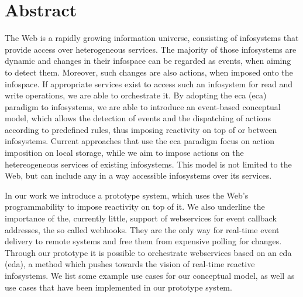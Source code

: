 \chapter*{Abstract}
The Web is a rapidly growing information universe, consisting of \textrm{\glspl{infosystem}} that provide access over heterogeneous services.
The majority of those \textrm{\glspl{infosystem}} are dynamic and changes in their \textrm{\gls{infospace}} can be regarded as events, when aiming to detect them.
Moreover, such changes are also actions, when imposed onto the \textrm{\gls{infospace}}.
If appropriate services exist to access such an \textrm{\gls{infosystem}} for read and write operations, we are able to orchestrate it.
By adopting the \textrm{\acrlong{eca} (\acrshort{eca})} paradigm to \textrm{\glspl{infosystem}}, we are able to introduce an event-based conceptual model, which allows the detection of events and the dispatching of actions according to predefined rules, thus imposing reactivity on top of or between \textrm{\glspl{infosystem}}.
Current approaches that use the \textrm{\acrshort{eca}} paradigm focus on action imposition on local storage, while we aim to impose actions on the hetereogeneous services of existing \textrm{\glspl{infosystem}}.
This model is not limited to the Web, but can include any in a way accessible \textrm{\glspl{infosystem}} over its services.

In our work we introduce a prototype system, which uses the Web's programmability to impose reactivity on top of it.
We also underline the importance of the, currently little, support of \textrm{\glspl{webservice}} for event callback addresses, the so called \textrm{\glspl{webhook}}.
They are the only way for real-time event delivery to remote systems and free them from expensive polling for changes.
Through our prototype it is possible to orchestrate \textrm{\glspl{webservice}} based on an \textrm{\acrlong{eda} (\acrshort{eda})}, a method which pushes towards the vision of real-time reactive \textrm{\glspl{infosystem}}.
We list some example use cases for our conceptual model, as well as use cases that have been implemented in our prototype system.
